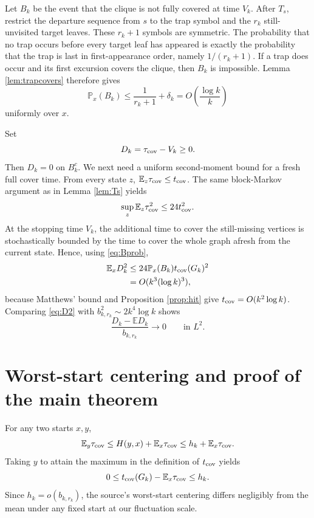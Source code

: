 \documentclass[11pt]{article}
\newcommand{\E}{\mathbb E}
\newcommand{\Pp}{\mathbb P}
\begin{document}
Let $B_k$ be the event that the clique is not fully covered at time $V_k$.
After $T_s$, restrict the departure sequence from $s$ to the trap symbol and
the $r_k$ still-unvisited target leaves.  These $r_k+1$ symbols are symmetric.
The probability that no trap occurs before every target leaf has appeared is
exactly the probability that the trap is last in first-appearance order,
namely $1/(r_k+1)$.  If a trap does occur and its first excursion covers the
clique, then $B_k$ is impossible.  Lemma \ref{lem:trapcovers} therefore gives
\begin{equation}\label{eq:Bprob}
 \Pp_x(B_k)
 \le \frac1{r_k+1}+\delta_k
 =O\!\left(\frac{\log k}{k}\right)
\end{equation}
uniformly over $x$.

Set
\[
 D_k=\tau_{\rm cov}-V_k\ge0.
\]
Then $D_k=0$ on $B_k^c$.  We next need a uniform second-moment bound for a
fresh full cover time.  From every state $z$,
$\E_z\tau_{\rm cov}\le t_{\rm cov}$.  The same block-Markov argument as in
Lemma \ref{lem:Ts} yields
\begin{equation}\label{eq:coversecond}
 \sup_z\E_z\tau_{\rm cov}^2\le24t_{\rm cov}^2.
\end{equation}
At the stopping time $V_k$, the additional time to cover the still-missing
vertices is stochastically bounded by the time to cover the whole graph afresh
from the current state.  Hence, using \eqref{eq:Bprob},
\begin{align}
 \E_xD_k^2
 &\le 24\Pp_x(B_k)t_{\rm cov}(G_k)^2\notag\\
 &=O(k^3(\log k)^3),\label{eq:D2}
\end{align}
because Matthews' bound and Proposition \ref{prop:hit} give
$t_{\rm cov}=O(k^2\log k)$.  Comparing \eqref{eq:D2} with
$b_{k,r_k}^2\sim2k^4\log k$ shows
\begin{equation}\label{eq:Dsmall}
 \frac{D_k-\E D_k}{b_{k,r_k}}\longrightarrow0
 \qquad\text{in }L^2.
\end{equation}

\section{Worst-start centering and proof of the main theorem}

For any two starts $x,y$,
\[
 \E_y\tau_{\rm cov}\le H(y,x)+\E_x\tau_{\rm cov}\le h_k+\E_x\tau_{\rm cov}.
\]
Taking $y$ to attain the maximum in the definition of $t_{\rm cov}$ yields
\begin{equation}\label{eq:meanstart}
 0\le t_{\rm cov}(G_k)-\E_x\tau_{\rm cov}\le h_k.
\end{equation}
Since $h_k=o(b_{k,r_k})$, the source's worst-start centering differs
negligibly from the mean under any fixed start at our fluctuation scale.
\end{document}
